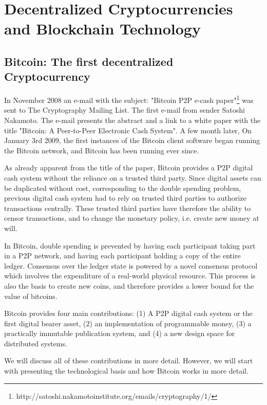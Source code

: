 \chapter{Decentralized Cryptocurrencies and Blockchain Technology}
\label{sec:crypto}


\section{Bitcoin: The first decentralized Cryptocurrency}

 In November 2008 an e-mail with the subject: "Bitcoin P2P e-cash paper"\footnote{http://satoshi.nakamotoinstitute.org/emails/cryptography/1/} was sent to The Cryptography Mailing List. The first e-mail from sender Satoshi Nakamoto. The e-mail presents the abstract and a link to a white paper with the title "Bitcoin: A Peer-to-Peer Electronic Cash System". A few month later, On January 3rd 2009, the first instances of the Bitcoin client software began running the Bitcoin network, and Bitcoin has been running ever since. 

 As already apparent from the title of the paper, Bitcoin provides a P2P digital cash system without the reliance on a trusted third party. Since digital assets can be duplicated without cost, corresponding to the double spending problem, previous digital cash system had to rely on trusted third parties to authorize transactions centrally. These trusted third parties have therefore the ability to censor transactions, and to change the monetary policy, i.e. create new money at will. 

 In Bitcoin, double spending is prevented by having each participant taking part in a P2P network, and having each participant holding a copy of the entire ledger. Consensus over the ledger state is powered by a novel consensus protocol which involves the expenditure of a real-world physical resource. This process is also the basis to create new coins, and therefore provides a lower bound for the value of bitcoins. 

Bitcoin provides four main contributions: (1) A P2P digital cash system or the first digital bearer asset, (2) an implementation of programmable money, (3) a practically immutable publication system, and (4) a new design space for distributed systems. 

We will discuss all of these contributions in more detail. However, we will start with presenting the technological basis and how Bitcoin works in more detail.

